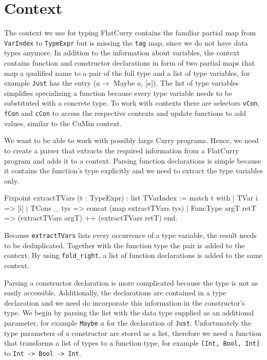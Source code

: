 \documentclass[fleqn, abstract=on]{scrreprt}
\newcommand{\coqinline}[1]{\texttt{#1}}
\begin{document}
\section{Context}
\label{context}
The context we use for typing FlatCurry contains the familiar partial map from \coqinline{VarIndex} to \coqinline{TypeExpr} but is missing the \coqinline{tag} map, since we do not have data types anymore. In addition to the information about variables, the context contains function and constructor declarations in form of two partial maps that map a qualified name to a pair of the full type and a list of type variables, for example \texttt{Just} has the entry ($a \rightarrow$ Maybe $a$, [$a$]). The list of type variables simplifies specializing a function because every type variable needs to be substituted with a concrete type. To work with contexts there are selectors \coqinline{vCon}, \coqinline{fCon} and \coqinline{cCon} to access the respective contexts and update functions to add values, similar to the CuMin context.\\
\par
We want to be able to work with possibly large Curry programs. Hence, we need to create a parser that extracts the required information from a FlatCurry program and adds it to a context. Parsing function declarations is simple because it contains the function's type explicitly and we need to extract the type variables only.
\begin{coqcode}
Fixpoint extractTVars (t : TypeExpr) : list TVarIndex :=
  match t with
  | TVar i      => [i]
  | TCons _ tys => concat (map extractTVars tys)
  | FuncType argT retT => (extractTVars argT) ++ (extractTVars retT)
  end.
\end{coqcode}
Because \coqinline{extractTVars} lists every occurrence of a type variable, the result needs to be deduplicated. Together with the function type the pair is added to the context. By using \coqinline{fold_right}, a list of function declarations is added to the same context.
\par
Parsing a constructor declaration is more complicated because the type is not as easily accessible. Additionally, the declarations are contained in a type declaration and we need do incorporate this information in the constructor's type. We begin by parsing the list with the data type supplied as an additional parameter, for example \texttt{Maybe} $a$ for the declaration of \texttt{Just}. Unfortunately the type parameters of a constructor are stored as a list, therefore we need a function that transforms a list of types to a function type, for example \texttt{[Int, Bool, Int]} to \texttt{Int -> Bool -> Int}.
\end{document}
